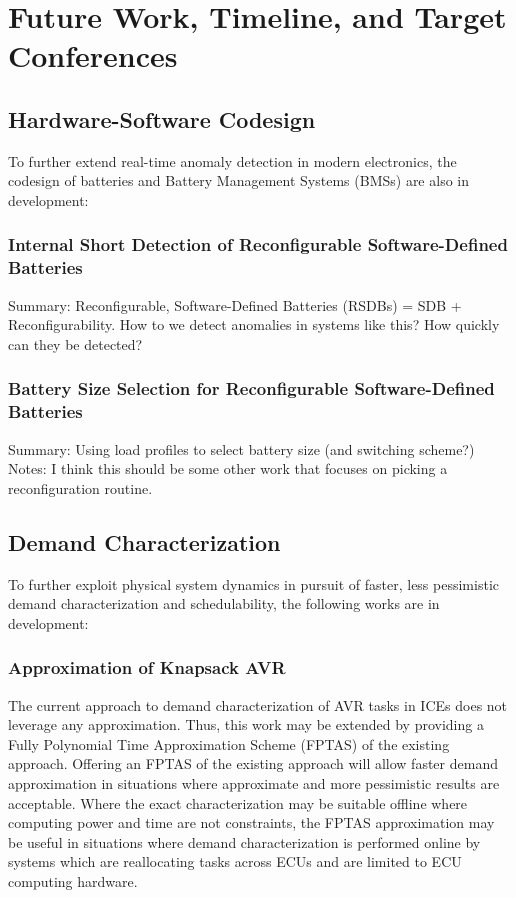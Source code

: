 \section{Future Work, Timeline, and Target Conferences} \label{chap:futureWork}

\subsection{Hardware-Software Codesign}

To further extend real-time anomaly detection in modern electronics, the codesign of batteries and Battery Management Systems (BMSs) are also in development:

\subsubsection{Internal Short Detection of Reconfigurable Software-Defined Batteries}

Summary: Reconfigurable, Software-Defined Batteries (RSDBs) = SDB + Reconfigurability. How to we detect anomalies in systems like this? How quickly can they be detected?

\subsubsection{Battery Size Selection for Reconfigurable Software-Defined Batteries}

Summary: Using load profiles to select battery size (and switching scheme?)
Notes: I think this should be some other work that focuses on picking a reconfiguration routine.

\subsection{Demand Characterization}

To further exploit physical system dynamics in pursuit of faster, less pessimistic demand characterization and schedulability, the following works are in development:

\subsubsection{Approximation of Knapsack AVR}

The current approach to demand characterization of AVR tasks in ICEs does not leverage any approximation.
Thus, this work may be extended by providing a Fully Polynomial Time Approximation Scheme (FPTAS) of the existing approach.
Offering an FPTAS of the existing approach will allow faster demand approximation in situations where approximate and more pessimistic results are acceptable.
Where the exact characterization may be suitable offline where computing power and time are not constraints, the FPTAS approximation may be useful in situations where demand characterization is performed online by systems which are reallocating tasks across ECUs and are limited to ECU computing hardware.


